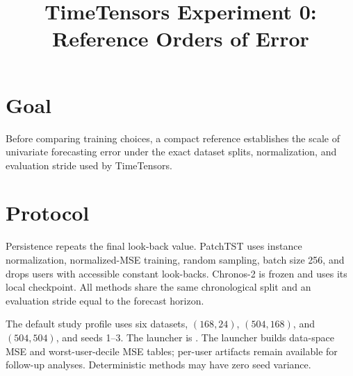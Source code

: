 \documentclass[10pt]{article}
\title{TimeTensors Experiment 0: Reference Orders of Error}
\author{}
\date{}
\begin{document}
\maketitle
\section{Goal}
Before comparing training choices, a compact reference establishes the scale
of univariate forecasting error under the exact dataset splits, normalization,
and evaluation stride used by TimeTensors.


\section{Protocol}
Persistence repeats the final look-back value. PatchTST uses instance
normalization, normalized-MSE training, random sampling, batch size 256, and
drops users with accessible constant look-backs. Chronos-2 is frozen and uses
its local checkpoint. All methods share the same chronological split and an
evaluation stride equal to the forecast horizon.

The default study profile uses six datasets, $(168,24)$, $(504,168)$, and
$(504,504)$, and seeds 1--3. The launcher is
. The launcher builds data-space MSE
and worst-user-decile MSE tables; per-user artifacts remain available for
follow-up analyses. Deterministic methods may have zero seed variance.
\end{document}

